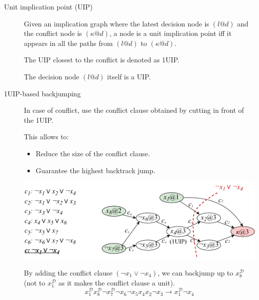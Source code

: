 \begin{description}
    \item[Unit implication point (UIP)]
        Given an implication graph where the latest decision node is $(l@d)$ and the conflict node is $(\kappa@d)$,
        a node is a unit implication point iff it appears in all the paths from $(l@d)$ to $(\kappa@d)$.

        The UIP closest to the conflict is denoted as 1UIP.

        \begin{remark}
            The decision node $(l@d)$ itself is a UIP.
        \end{remark}

    \item[1UIP-based backjumping]
        In case of conflict, use the conflict clause obtained by cutting in front of the 1UIP.

        \begin{remark}
            This allows to:
            \begin{itemize}
                \item Reduce the size of the conflict clause.
                \item Guarantee the highest backtrack jump.
            \end{itemize}
        \end{remark}

        \begin{example}
            \phantom{}
            \begin{center}
                \includegraphics[width=0.75\linewidth]{./img/_cdcl_1uip.pdf}
            \end{center}
            By adding the conflict clause $(\lnot x_1 \vee \lnot x_4)$, we can backjump up to $x_8^\mathcal{D}$ 
            (not to $x_1^\mathcal{D}$ as it makes the conflict clause a unit).
            \[ x_1^\mathcal{D} x_8^\mathcal{D} \lnot x_7^\mathcal{D} \lnot x_6 \lnot x_5 x_4 x_2 \lnot x_3 \rightarrow x_1^\mathcal{D} \lnot x_4\]
        \end{example}
\end{description}



